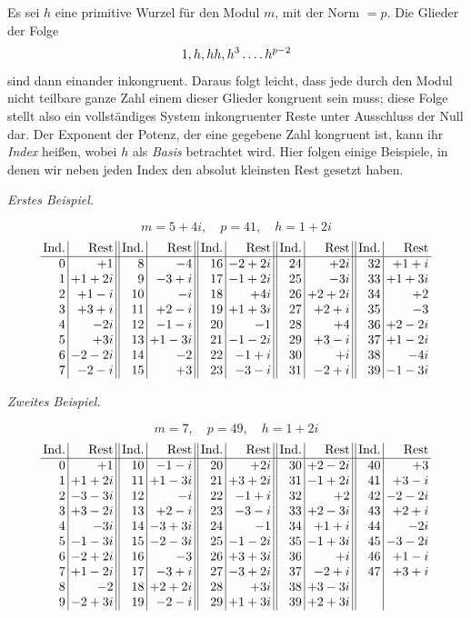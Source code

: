 Es sei $h$ eine primitive Wurzel für den Modul $m$, mit der Norm $=p$. Die Glieder der Folge
\[
1,h,hh,h^3\mathinner{.\,.\,.\,.} h^{p-2}
\]
sind dann einander inkongruent. Daraus folgt leicht, dass jede durch den Modul nicht teilbare ganze Zahl einem dieser Glieder kongruent sein muss; diese Folge stellt also ein vollständiges System inkongruenter Reste unter Ausschluss der Null dar. Der Exponent der Potenz, der eine gegebene Zahl kongruent ist, kann ihr \emph{Index} heißen, wobei $h$ als \emph{Basis} betrachtet wird. Hier folgen einige Beispiele, in denen wir neben jeden Index den absolut kleinsten Rest gesetzt haben.

\begin{center}\emph{Erstes Beispiel.}\end{center}
\[
m=5+4i,\quad p=41,\quad h=1+2i
\]
\begingroup\small
\[
\setlength{\arraycolsep}{2pt}
\begin{array}{r|r||r|r||r|r||r|r||r|r}
\text{Ind.}&\text{Rest}&\text{Ind.}&\text{Rest}&\text{Ind.}&\text{Rest}&\text{Ind.}&\text{Rest}&\text{Ind.}&\text{Rest}\\\hline
0&+1&8&-4&16&-2+2i&24&+2i&32&+1+i\\
1&+1+2i&9&-3+i&17&-1+2i&25&-3i&33&+1+3i\\
2&+1-i&10&-i&18&+4i&26&+2+2i&34&+2\\
3&+3+i&11&+2-i&19&+1+3i&27&+2+i&35&-3\\
4&-2i&12&-1-i&20&-1&28&+4&36&+2-2i\\
5&+3i&13&+1-3i&21&-1-2i&29&+3-i&37&+1-2i\\
6&-2-2i&14&-2&22&-1+i&30&+i&38&-4i\\
7&-2-i&15&+3&23&-3-i&31&-2+i&39&-1-3i
\end{array}
\]
\endgroup

%
\begin{center}\emph{Zweites Beispiel.}\end{center}
\[
m=7,\quad p=49,\quad h=1+2i
\]
\begingroup\small
\[
\setlength{\arraycolsep}{2pt}
\begin{array}{r|r||r|r||r|r||r|r||r|r}
\text{Ind.}&\text{Rest}&\text{Ind.}&\text{Rest}&\text{Ind.}&\text{Rest}&\text{Ind.}&\text{Rest}&\text{Ind.}&\text{Rest}\\\hline
0&+1&10&-1-i&20&+2i&30&+2-2i&40&+3\\
1&+1+2i&11&+1-3i&21&+3+2i&31&-1+2i&41&+3-i\\
2&-3-3i&12&-i&22&-1+i&32&+2&42&-2-2i\\
3&+3-2i&13&+2-i&23&-3-i&33&+2-3i&43&+2+i\\
4&-3i&14&-3+3i&24&-1&34&+1+i&44&-2i\\
5&-1-3i&15&-2-3i&25&-1-2i&35&-1+3i&45&-3-2i\\
6&-2+2i&16&-3&26&+3+3i&36&+i&46&+1-i\\
7&+1-2i&17&-3+i&27&-3+2i&37&-2+i&47&+3+i\\
8&-2&18&+2+2i&28&+3i&38&+3-3i&&\\
9&-2+3i&19&-2-i&29&+1+3i&39&+2+3i&&
\end{array}
\]
\endgroup

